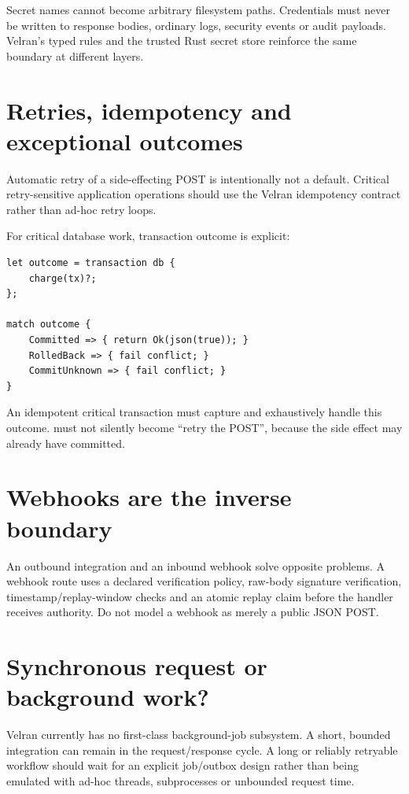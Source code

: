 Secret names cannot become arbitrary filesystem paths. Credentials must never be written to response bodies, ordinary logs, security events or audit payloads. Velran's typed  rules and the trusted Rust secret store reinforce the same boundary at different layers.

\section{Retries, idempotency and exceptional outcomes}

Automatic retry of a side-effecting POST is intentionally not a default. Critical retry-sensitive application operations should use the Velran idempotency contract rather than ad-hoc retry loops.

For critical database work, transaction outcome is explicit:

\begin{lstlisting}[language=Velran]
let outcome = transaction db {
    charge(tx)?;
};

match outcome {
    Committed => { return Ok(json(true)); }
    RolledBack => { fail conflict; }
    CommitUnknown => { fail conflict; }
}
\end{lstlisting}

An idempotent critical transaction must capture and exhaustively handle this outcome.  must not silently become ``retry the POST'', because the side effect may already have committed.

\section{Webhooks are the inverse boundary}

An outbound integration and an inbound webhook solve opposite problems. A webhook route uses a declared verification policy, raw-body signature verification, timestamp/replay-window checks and an atomic replay claim before the handler receives authority. Do not model a webhook as merely a public JSON POST.

\section{Synchronous request or background work?}

Velran currently has no first-class background-job subsystem. A short, bounded integration can remain in the request/response cycle. A long or reliably retryable workflow should wait for an explicit job/outbox design rather than being emulated with ad-hoc threads, subprocesses or unbounded request time.

